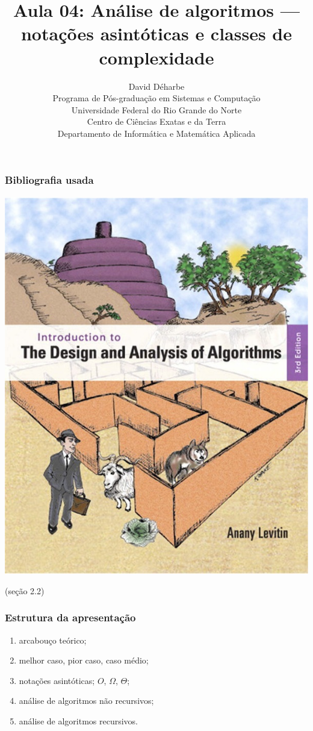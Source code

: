 \documentclass{beamer}
\title{Aula 04: Análise de algoritmos --- notações asintóticas e classes de complexidade}
\author{David Déharbe \\
  Programa de Pós-graduação em Sistemas e Computação \\
  Universidade Federal do Rio Grande do Norte \\
  Centro de Ciências Exatas e da Terra \\
  Departamento de Informática e Matemática Aplicada}
\date{}
\begin{document}

\begin{frame}
  \titlepage
\end{frame}

\begin{frame}

  \frametitle{Bibliografia usada}

  \begin{center}
    \includegraphics[height=.8\textheight]{img/capa-levitin.jpg}
  \end{center}
  (seção 2.2)
\end{frame}

\begin{frame}

  \frametitle{Estrutura da apresentação}

  \begin{enumerate}
  \item arcabouço teórico;
  \item melhor caso, pior caso, caso médio;
  \item \alert{notações asintóticas; $O$, $\Omega$, $\Theta$};
  \item análise de algoritmos não recursivos;
  \item análise de algoritmos recursivos.
  \end{enumerate}
\end{frame}
\end{document}
